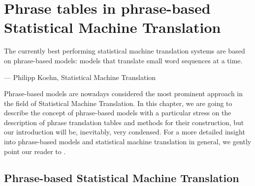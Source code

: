 
\chapter{Phrase tables in phrase-based Statistical Machine Translation}
\label{chap:phrase-based}


\setlength{\epigraphwidth}{1.0\textwidth}
\epigraph{The currently best performing statistical machine translation systems are based on
phrase-based models: models that translate small word sequences at a time.}{--- Philipp Koehn, Statistical Machine Translation}

Phrase-based models are nowadays considered the most prominent approach
in the field of Statistical Machine Translation.
In this chapter, we are going to describe the concept of phrase-based models with a particular stress
on the description of phrase translation tables and methods for their construction,
but our introduction will be, inevitably, very condensed.
For a more detailed insight into phrase-based models and statistical machine
translation in general, we gently point our reader to \citet{koehn:smt}.

\section{Phrase-based Statistical Machine Translation}

